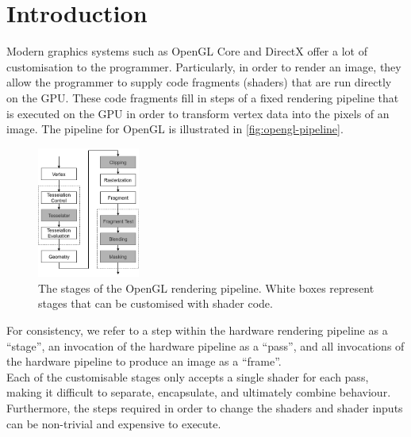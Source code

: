 \documentclass[format=sigconf]{acmart}
\begin{document}

\maketitle

\newpage

\def\abovecaptionskip{1pt}
\def\listingautorefname{listing}
\def\figureautorefname{figure}

\section{Introduction}\label{introduction}
Modern graphics systems such as OpenGL Core and DirectX offer a lot of customisation to the programmer. Particularly, in order to render an image, they allow the programmer to supply code fragments (shaders) that are run directly on the GPU. These code fragments fill in steps of a fixed rendering pipeline that is executed on the GPU in order to transform vertex data into the pixels of an image. The pipeline for OpenGL is illustrated in \autoref{fig:opengl-pipeline}. \\

\begin{figure}[h]
  \begin{center}
    \includegraphics[width=0.3\textwidth]{opengl-pipeline.png}
  \end{center}
  \caption{The stages of the OpenGL rendering pipeline. White boxes represent stages that can be customised with shader code.}
  \label{fig:opengl-pipeline}
\end{figure}

For consistency, we refer to a step within the hardware rendering pipeline as a ``stage'', an invocation of the hardware pipeline as a ``pass'', and all invocations of the hardware pipeline to produce an image as a ``frame''. \\

Each of the customisable stages only accepts a single shader for each pass, making it difficult to separate, encapsulate, and ultimately combine behaviour. Furthermore, the steps required in order to change the shaders and shader inputs can be non-trivial and expensive to execute. \\
\end{document}
